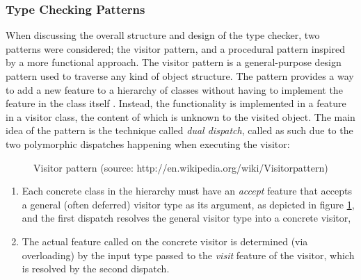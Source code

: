 \subsubsection{Type Checking Patterns}
\label{design-tc-patterns}
When discussing the overall structure and design of the type checker, two patterns were considered; the visitor pattern, and a procedural pattern inspired by a more functional approach.
The visitor pattern is a general-purpose design pattern used to traverse any kind of object structure. The pattern provides a way to add a new feature to a hierarchy of classes without having to implement the feature in the class itself \cite{martin2002}. Instead, the functionality is implemented in a feature in a visitor class, the content of which is unknown to the visited object. The main idea of the pattern is the technique called \textit{dual dispatch}, called as such due to the two polymorphic dispatches happening when executing the visitor: 
\begin{figure}[H]
\centerline{}
    \caption[Visitor pattern]{Visitor pattern (source: http://en.wikipedia.org/wiki/Visitor\textunderscore pattern)}
    \label{fig:visitor-pattern}
\end{figure}
\begin{enumerate}
\item Each concrete class in the hierarchy must have an \textit{accept} feature that accepts a general (often deferred) visitor type as its argument, as depicted in figure \ref{fig:visitor-pattern}, and the first dispatch resolves the general visitor type into a concrete visitor,
\item The actual feature called on the concrete visitor is determined (via overloading) by the input type passed to the \textit{visit} feature of the visitor, which is resolved by the second dispatch.  
\end{enumerate}
